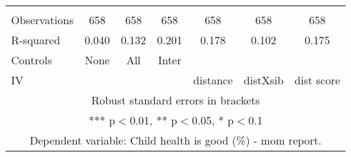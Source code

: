 \begin{tabular}{lcccccc}
 &  &  &  &  &  &  \\
Observations & 658 & 658 & 658 & 658 & 658 & 658 \\
R-squared & 0.040 & 0.132 & 0.201 & 0.178 & 0.102 & 0.175 \\
Controls & None & All & Inter &  &  &  \\
 IV &  &  &  & distance & distXsib & dist score \\ \hline
\multicolumn{7}{c}{ Robust standard errors in brackets} \\
\multicolumn{7}{c}{ *** p$<$0.01, ** p$<$0.05, * p$<$0.1} \\
\multicolumn{7}{c}{ Dependent variable: Child health is good (\%) - mom report.} \\
\end{tabular}
